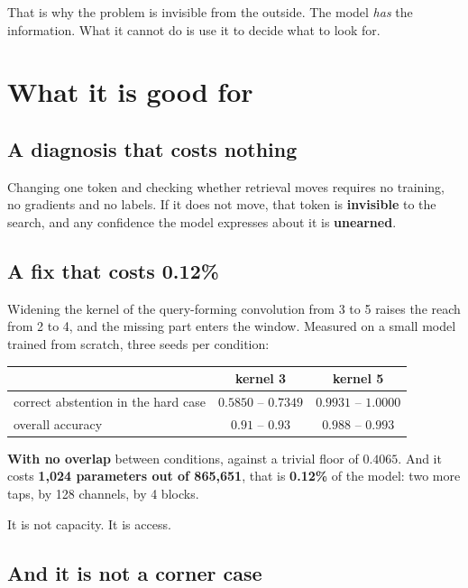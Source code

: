 \documentclass[11pt,a4paper]{article}
\begin{document}
That is why the problem is invisible from the outside. The model \emph{has} the information. What it
cannot do is use it to decide what to look for.

\section{What it is good for}

\subsection*{A diagnosis that costs nothing}

Changing one token and checking whether retrieval moves requires no training, no gradients and no
labels. If it does not move, that token is \textbf{invisible} to the search, and any confidence the
model expresses about it is \textbf{unearned}.

\subsection*{A fix that costs 0.12\%}

Widening the kernel of the query-forming convolution from 3 to 5 raises the reach from 2 to 4, and the
missing part enters the window. Measured on a small model trained from scratch, three seeds per
condition:

\begin{center}
\begin{tabular}{lcc}
\toprule
 & kernel 3 & kernel 5 \\
\midrule
correct abstention in the hard case & $0.5850$ -- $0.7349$ & $\mathbf{0.9931}$ -- $\mathbf{1.0000}$ \\
overall accuracy & $0.91$ -- $0.93$ & $\mathbf{0.988}$ -- $\mathbf{0.993}$ \\
\bottomrule
\end{tabular}
\end{center}

\textbf{With no overlap} between conditions, against a trivial floor of $0.4065$. And it costs
\textbf{1{,}024 parameters out of 865{,}651}, that is \textbf{0.12\%} of the model: two more taps, by
128 channels, by 4 blocks.

It is not capacity. It is access.

\subsection*{And it is not a corner case}
\end{document}
